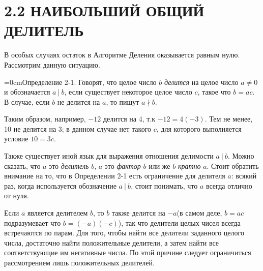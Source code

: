 \documentclass[11pt]{article}
\begin{document}
\section*{2.2 НАИБОЛЬШИЙ ОБЩИЙ ДЕЛИТЕЛЬ}
В особых случаях остаток в Алгоритме Деления оказывается равным нулю. Рассмотрим данную ситуацию.

\leftskip=0cm \rightskip=0cmОпределение 2-1. Говорят, что целое число $b$ \textit{делится} на целое число $a\neq 0$ и обозначается $a\ |\  b$, если существует некоторое целое число $c$, такое что $b=ac$. В случае, если $b$ не делится на $a$, то пишут $a\nmid b$.

\leftskip=-0.9cm \rightskip=-0.9cm \qquad \quad Таким образом, например, $-12$ делится на 4, т.к $-12=4(-3)$. Тем не менее, 10 не делится на 3; в данном случае нет такого $c$, для которого выполняется условие $10=3c$. 

\qquad \quad Также существует иной язык для выражения отношения делимости $a\ |\ b$. Можно сказать, что $a$ это \textit{делитель} $b$, $a$ это \textit{фактор} $b$ или же $b$ \textit{кратно} $a$. Стоит обратить внимание на то, что в Определении 2-1 есть ограничение для делителя $a$: всякий раз, когда используется обозначение $a\ |\ b$, стоит понимать, что $a$ всегда отлично от нуля.

\qquad \quad Если $a$ является делителем $b$, то $b$ также делится на $-a$(в самом деле, $b=ac$ подразумевает что $b=(-a)(-c)$), так что делители целых чисел всегда встречаются по парам. Для того, чтобы найти все делители заданного целого числа, достаточно найти положительные делители, а затем найти все соответствующие им негативные числа. По этой причине следует ограничиться рассмотрением лишь положительных делителей. 
\end{document}
